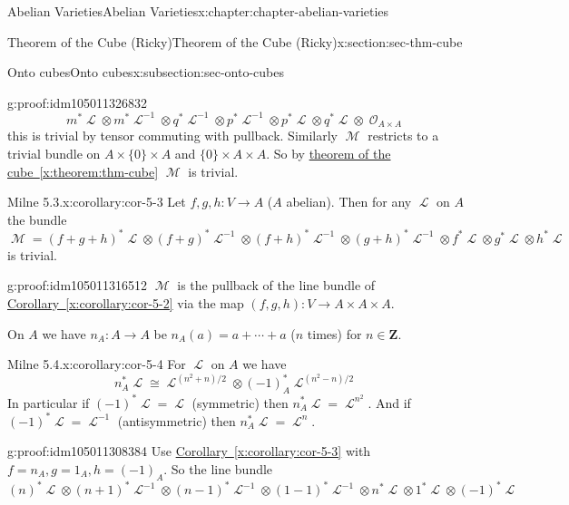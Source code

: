 \documentclass[oneside,10pt,]{book}
\numberwithin{equation}{section}
\newcommand{\sheaf}[1]{\operatorname{\mathcal{#1}}}
\newcommand{\ZZ}{\mathbf{Z}}
\begin{document}
\begin{chapterptx}{Abelian Varieties}{}{Abelian Varieties}{}{}{x:chapter:chapter-abelian-varieties}
\begin{sectionptx}{Theorem of the Cube (Ricky)}{}{Theorem of the Cube (Ricky)}{}{}{x:section:sec-thm-cube}
\begin{subsectionptx}{Onto cubes}{}{Onto cubes}{}{}{x:subsection:sec-onto-cubes}
\begin{proofptx}{}{g:proof:idm105011326832}
\begin{equation*}
m^* \sheaf L \otimes m^* \sheaf L^{-1} \otimes q^* \sheaf L^{-1} \otimes p^*\sheaf L^{-1} \otimes p^*\sheaf L \otimes q^*\sheaf L \otimes \sheaf O_{A\times A}
\end{equation*}
this is trivial by tensor commuting with pullback. Similarly \(\sheaf M\) restricts to a trivial bundle on \(A\times \{0\} \times A\) and \(\{0\}\times A \times A\). So by \hyperref[x:theorem:thm-cube]{theorem of the cube~\ref{x:theorem:thm-cube}} \(\sheaf M\) is trivial.%
\end{proofptx}
\begin{corollary}{Milne 5.3.}{}{x:corollary:cor-5-3}%
Let \(f,g, h\colon V \to A\) (\(A\) abelian). Then for any \(\sheaf L\) on \(A\) the bundle%
\begin{equation*}
\sheaf M  = (f+g+h)^*\sheaf L \otimes (f+g)^*\sheaf L^{-1}\otimes (f+h)^*\sheaf L^{-1}\otimes (g+h)^*\sheaf L^{-1} \otimes   f^*\sheaf L \otimes   g^*\sheaf L \otimes   h^*\sheaf L
\end{equation*}
is trivial.%
\end{corollary}
\begin{proofptx}{}{g:proof:idm105011316512}
\(\sheaf M\) is the pullback of the line bundle of \hyperref[x:corollary:cor-5-2]{Corollary~\ref{x:corollary:cor-5-2}} via the map \((f,g,h) \colon V \to A\times A\times A\).%
\end{proofptx}
On \(A\) we have \(n_A \colon A\to A\) be \(n_A(a) = a+\cdots + a\) (\(n\) times) for \(n\in \ZZ\).%
\begin{corollary}{Milne 5.4.}{}{x:corollary:cor-5-4}%
For \(\sheaf L\) on \(A\) we have%
\begin{equation*}
n^*_A\sheaf L \cong \sheaf L^{(n^2 + n)/2} \otimes (-1)_A^* \sheaf L^{(n^2 - n)/2}
\end{equation*}
In particular if \((-1)^* \sheaf L = \sheaf L\) (symmetric) then \(n_A^* \sheaf L = \sheaf L^{n^2}\). And if \((-1)^* \sheaf L = \sheaf L^{-1}\) (antisymmetric) then \(n_A^* \sheaf L = \sheaf L^{n}\).%
\end{corollary}
\begin{proofptx}{}{g:proof:idm105011308384}
Use \hyperref[x:corollary:cor-5-3]{Corollary~\ref{x:corollary:cor-5-3}} with \(f= n_A, g = 1_A, h = (-1)_A\). So the line bundle%
\begin{equation*}
(n)^*\sheaf L \otimes (n+1)^*\sheaf L^{-1}\otimes (n-1)^*\sheaf L^{-1}\otimes (1-1)^*\sheaf L^{-1} \otimes   n^*\sheaf L \otimes   1^*\sheaf L \otimes   (-1)^*\sheaf L
\end{equation*}

\end{proofptx}
\end{subsectionptx}
\end{sectionptx}
\end{chapterptx}
\end{document}
